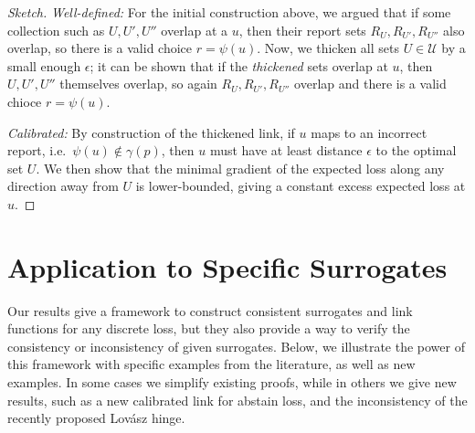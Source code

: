 \documentclass[12pt]{article}
\newcommand{\Comments}{1}
\newcommand{\mytodo}[2]{\ifnum\Comments=1%
  \todo[linecolor=#1!80!black,backgroundcolor=#1,bordercolor=#1!80!black]{#2}\fi}
\newcommand{\btw}[1]{}%
\newcommand{\R}{\mathcal{R}}
\newcommand{\U}{\mathcal{U}}
\begin{document}
\begin{proof}[Sketch]
  \emph{Well-defined:}
  For the initial construction above, we argued that if some collection such as $U,U',U''$ overlap at a $u$, then their report sets $R_U, R_{U'}, R_{U''}$ also overlap, so there is a valid choice $r = \psi(u)$.
  Now, we thicken all sets $U \in \U$ by a small enough $\epsilon$; it can be shown that if the \emph{thickened} sets overlap at $u$, then $U,U',U''$ themselves overlap, so again $R_U, R_{U'}, R_{U''}$ overlap and there is a valid chioce $r = \psi(u)$.

  \emph{Calibrated:} By construction of the thickened link, if $u$ maps to an incorrect report, i.e.\ $\psi(u) \not\in \gamma(p)$, then $u$ must have at least distance $\epsilon$ to the optimal set $U$.
  We then show that the minimal gradient of the expected loss along any direction away from $U$ is lower-bounded, giving a constant excess expected loss at $u$.
\end{proof}

\btw{FUTURE: we should comment in the discussion section that we probably can show that *any* loss embedding $\ell$ must be polyhedral-ish, meaning polyhedral except for stuff that is never optimal.  This theorem would then not need the ``polyhedral'' part. This is related to the ``convex envelope conjucture'', that if $L$ embeds $\ell$ via $\varphi$, you can just take the loss $L'$ such that $L_y$ is the convex envelope of points $\{(\varphi(r),L(r)_y)\}_{r\in\R}$.}
\btw{FUTURE: This prop and theorem give an excellent reason to focus on embeddings, since other techniques do not necessarily give you separated links for free.  Since we know we get them for free, we can just focus on the property, and study elicitation complexity; we know if we have a link at all it can be taken to be separated.  [[Is this true?]]}



\section{Application to Specific Surrogates}\label{sec:examples}

Our results give a framework to construct consistent surrogates and link functions for any discrete loss, but they also provide a way to verify the consistency or inconsistency of given surrogates.
Below, we illustrate the power of this framework with specific examples from the literature, as well as new examples.
In some cases we simplify existing proofs, while in others we give new results, such as a new calibrated link for abstain loss, and the inconsistency of the recently proposed Lov\'asz hinge.
\btw{RF: The top-k and hypercube/set examples (except abstain) have the link built in, e.g.\ as the sign function), and they just work around it.  Our results may suggest that it's worth thinking ``outside the box'' (HAH, genious...) and looking for embeddings which are not the hypercube.}
\end{document}
